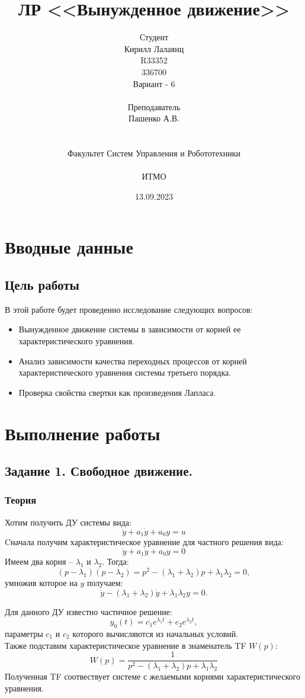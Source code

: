 \documentclass[16pt]{article}
\title{ЛР \textnumero 3 <<Вынужденное движение>>}
\author{
Студент \\
Кирилл Лалаянц\\
R33352\\
336700\\
Вариант - 6\\
\\
Преподаватель\\
Пашенко А.В. \\
\\
\\
Факультет Систем Управления и Робототехники\\
\\
ИТМО\\
}
\date{13.09.2023}
\begin{document}
\maketitle
\newpage
\tableofcontents
\thispagestyle{empty}

\newpage
\setcounter{page}{1}
\section{Вводные данные}
\subsection{Цель работы}
В этой работе будет проведенно исследование следующих вопросов:
\begin{itemize}
    \item Вынужденное движение системы в зависимости от корней ее характеристического уравнения. 
    \item Анализ зависимости качества переходных процессов от корней характеристического уравнения системы третьего порядка. 
    \item Проверка свойства свертки как произведения Лапласа. 
\end{itemize} 

\newpage
\section{Выполнение работы}
\label{sec:headings}


\subsection{Задание 1. Свободное движение.}

\subsubsection{Теория}
Хотим получить ДУ системы вида:
\[\ddot{y} + a_1\dot{y} + a_0y = u\]
Cначала получим характеристическое уравнение для частного решения вида:
\[\ddot{y} + a_1\dot{y} + a_0y = 0\]
Имеем два корня -- \(\lambda_1\) и \(\lambda_2\). Тогда:
\[ (p - \lambda_1)(p-\lambda_2) = p^2 - (\lambda_1 + \lambda_2)p + \lambda_1\lambda_2 = 0,\]
умножив которое на \(y\) получаем:
\[\ddot{y} - (\lambda_1 + \lambda_2)\dot{y} + \lambda_1\lambda_2y = 0.\]

Для данного ДУ известно частичное решение:
\[ y_{0}(t) = c_1 e^{\lambda_1 t} + c_2 e^{\lambda_2 t},\]
параметры \(c_1\) и \(c_2\) которого вычисляются из начальных условий.
\\
Также подставим характеристическое уравнение в знаменатель TF \(W(p)\):
\[W(p) = \frac{1}{p^2 - (\lambda_1 + \lambda_2)p + \lambda_1\lambda_2}\]
Полученная TF соотвествует системе с желаемыми корнями характеристического уравнения.
\end{document}
